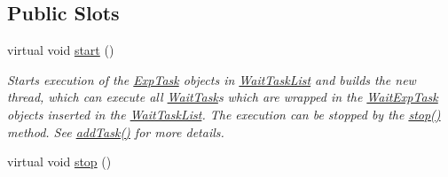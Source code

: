 \subsection*{Public Slots}
\begin{DoxyCompactItemize}
\item 
\hypertarget{class_wait_task_list_a991a520e472601b7c4457035c22c4c22}{}virtual void \hyperlink{class_wait_task_list_a991a520e472601b7c4457035c22c4c22}{start} ()\label{class_wait_task_list_a991a520e472601b7c4457035c22c4c22}

\begin{DoxyCompactList}\small\item\em Starts execution of the \hyperlink{class_exp_task}{Exp\+Task} objects in \hyperlink{class_wait_task_list}{Wait\+Task\+List} and builds the new thread, which can execute all \hyperlink{class_wait_task}{Wait\+Task}\textquotesingle{}s which are wrapped in the \hyperlink{class_wait_exp_task}{Wait\+Exp\+Task} objects inserted in the \hyperlink{class_wait_task_list}{Wait\+Task\+List}. The execution can be stopped by the \hyperlink{class_wait_task_list_acffb5d311033d065e2b5889a0c51f3f1}{stop()} method. See \hyperlink{class_wait_task_list_a429d0b45f82a2eef00c5dacffbbc1f70}{add\+Task()} for more details. \end{DoxyCompactList}\item 
\hypertarget{class_wait_task_list_acffb5d311033d065e2b5889a0c51f3f1}{}virtual void \hyperlink{class_wait_task_list_acffb5d311033d065e2b5889a0c51f3f1}{stop} ()\label{class_wait_task_list_acffb5d311033d065e2b5889a0c51f3f1}


\end{DoxyCompactItemize}

